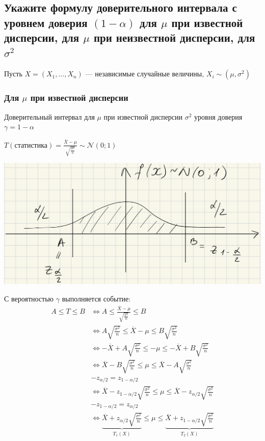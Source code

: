 \documentclass{article}
\begin{document}
\subsection{Укажите формулу доверительного интервала с уровнем доверия $(1-\alpha)$ для $\mu$ при известной дисперсии, для $\mu$ при неизвестной дисперсии, для $\sigma^{2}$}
Пусть $X=(X_1,\ldots,X_n)$ — независимые случайные величины, $X_i\sim(\mu,\sigma^2)$
\subsubsection{Для $\mu$ при известной дисперсии}
Доверительный интервал для $\mu$ при известной дисперсии $\sigma^2$ уровня доверия $\gamma=1-\alpha$

$T(\text{статистика})=\displaystyle\frac{\overline{X}-\mu}{\sqrt{\frac{\sigma^2}{n}}}\sim\mathcal{N}(0;1)$
\begin{center}
    \includegraphics[width=0.5\linewidth]{confidence_interval.png}
\end{center}
С вероятностью $\gamma$ выполняется событие:
\begin{equation*}
    \begin{aligned}
        A\leqslant T\leqslant B&\Longleftrightarrow A\leqslant \frac{\overline{X}-\mu}{\sqrt{\frac{\sigma^2}{n}}}\leqslant B\\
        &\Longleftrightarrow A\sqrt{\frac{\sigma^2}{n}}\leqslant\overline{X}-\mu\leqslant B\sqrt{\frac{\sigma^2}{n}}\\
        &\Longleftrightarrow-\overline{X}+A\sqrt{\frac{\sigma^2}{n}}\leqslant-\mu\leqslant-\overline{X}+B\sqrt{\frac{\sigma^2}{n}}\\
        &\Longleftrightarrow\overline{X}-B\sqrt{\frac{\sigma^2}{n}}\leqslant\mu\leqslant\overline{X}-A\sqrt{\frac{\sigma^2}{n}}\\
        &-z_{\alpha/2}=z_{1-\alpha/2}\\
        &\Longleftrightarrow\overline{X}-z_{1-\alpha/2}\sqrt{\frac{\sigma^2}{n}}\leqslant\mu\leqslant\overline{X}-z_{\alpha/2}\sqrt{\frac{\sigma^2}{n}}\\
        &-z_{1-\alpha/2}=z_{\alpha/2}\\
        &\Longleftrightarrow\underbrace{\overline{X}+z_{\alpha/2}\sqrt{\frac{\sigma^2}{n}}}_{T_1(X)}\leqslant\mu\leqslant\underbrace{\overline{X}+z_{1-\alpha/2}\sqrt{\frac{\sigma^2}{n}}}_{T_2(X)}
    \end{aligned}
\end{equation*}
\end{document}

